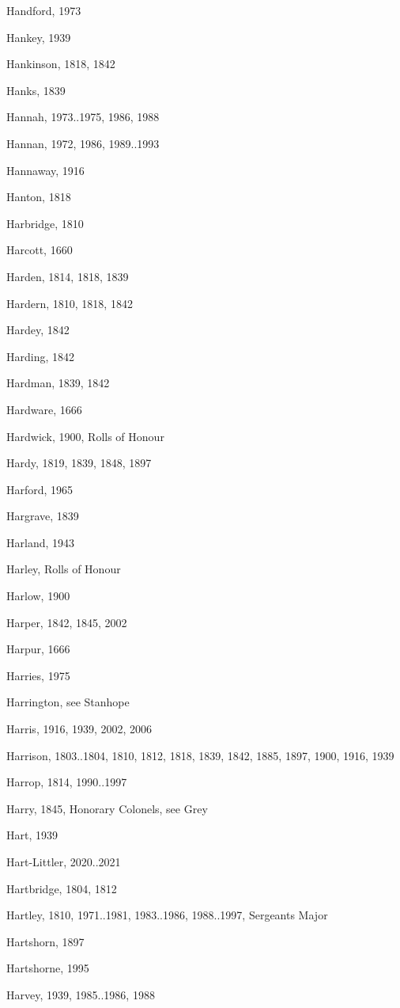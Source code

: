 {\begin{theindex}
\item Handford, 1973
\item Hankey, 1939
\item Hankinson, 1818, 1842
\item Hanks, 1839
\item Hannah, 1973..1975, 1986, 1988
\item Hannan, 1972, 1986, 1989..1993
\item Hannaway, 1916
\item Hanton, 1818
\item Harbridge, 1810
\item Harcott, 1660
\item Harden, 1814, 1818, 1839
\item Hardern, 1810, 1818, 1842
\item Hardey, 1842
\item Harding, 1842
\item Hardman, 1839, 1842
\item Hardware, 1666
\item Hardwick, 1900, Rolls of Honour
\item Hardy, 1819, 1839, 1848, 1897
\item Harford, 1965
\item Hargrave, 1839
\item Harland, 1943
\item Harley, Rolls of Honour
\item Harlow, 1900
\item Harper, 1842, 1845, 2002
\item Harpur, 1666
\item Harries, 1975
\item Harrington, see Stanhope
\item Harris, 1916, 1939, 2002, 2006
\item Harrison, 1803..1804, 1810, 1812, 1818, 1839, 1842, 1885, 1897, 1900, 1916, 1939
\item Harrop, 1814, 1990..1997
\item Harry, 1845, Honorary Colonels, see Grey
\item Hart, 1939
\item Hart-Littler, 2020..2021
\item Hartbridge, 1804, 1812
\item Hartley, 1810, 1971..1981, 1983..1986, 1988..1997, Sergeants Major
\item Hartshorn, 1897
\item Hartshorne, 1995
\item Harvey, 1939, 1985..1986, 1988

\end{theindex}}
